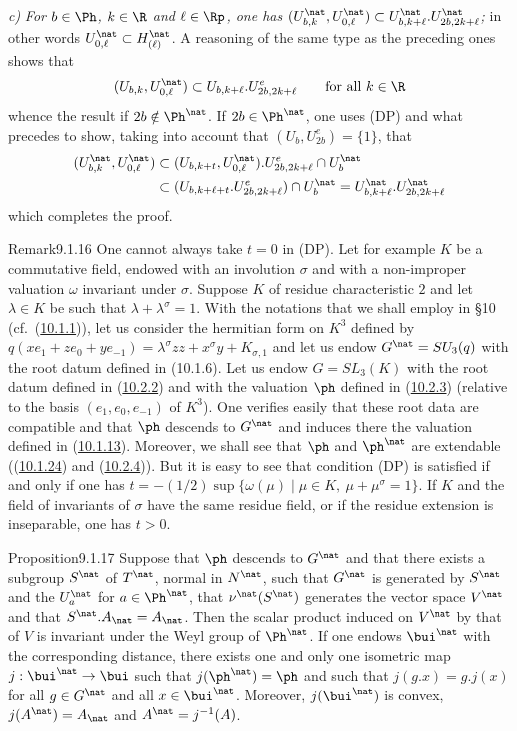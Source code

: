 \documentclass[12pt,a4paper,oneside,english]{smfart}
\makeatletter
\newcommand{\btanchor}[1]{\leavevmode\Hy@raisedlink{\hypertarget{bt:#1}{}}}
\newcommand{\btref}[1]{\hyperlink{bt:#1}{#1}}
\theoremstyle{definition}
\theoremstyle{bt}
\makeatother
\begin{document}
\medskip
\noindent
\textit{c)} \emph{For $b\in\Ph$, $k\in\R$ and $\ell\in\Rp$, one has
$(U^\nat_{b,k},U^\nat_{0,\ell})\subset U^\nat_{b,k+\ell}.U^\nat_{2b,2k+\ell}$;} in other
words $U^\nat_{0,\ell}\subset H^\nat_{(\ell)}$. A reasoning of the same type as the
preceding ones shows that
\[
(U_{b,k},U^\nat_{0,\ell})\subset U_{b,k+\ell}.U^e_{2b,2k+\ell}\qquad\text{for all } k\in\R
\]
whence the result if $2b\notin\Ph^\nat$. If $2b\in\Ph^\nat$, one uses (DP) and what
precedes to show, taking into account that $(U_b,U^e_{2b})=\{1\}$, that
\begin{align*}
(U^\nat_{b,k},U^\nat_{0,\ell})&\subset(U_{b,k+t},U^\nat_{0,\ell}).U^e_{2b,2k+\ell}\cap
U^\nat_b\\
&\subset(U_{b,k+\ell+t}.U^e_{2b,2k+\ell})\cap U^\nat_b
=U^\nat_{b,k+\ell}.U^\nat_{2b,2k+\ell}
\end{align*}
which completes the proof.

\begin{stmtup}{Remark}{9.1.16}\btanchor{9.1.16}
One cannot always take $t=0$ in (DP). Let for example $K$ be a commutative field,
endowed with an involution $\sigma$ and with a non-improper valuation $\omega$ invariant
under $\sigma$. Suppose $K$ of residue characteristic $2$ and let $\lambda\in K$ be such
that $\lambda+\lambda^\sigma=1$. With the notations that we shall employ in \S10
(cf.\ (\btref{10.1.1})), let us consider the hermitian form on $K^3$ defined by
$q(xe_1+ze_0+ye_{-1})=\lambda^\sigma zz+x^\sigma y+K_{\sigma,1}$ and let us endow
$G^\nat=SU_3(q)$ with the root datum defined in (10.1.6). Let us endow $G=SL_3(K)$ with
the root datum defined in (\btref{10.2.2}) and with the valuation $\ph$ defined in (\btref{10.2.3})
(relative to the basis $(e_1,e_0,e_{-1})$ of $K^3$). One verifies easily that these root
data are compatible and that $\ph$ descends to $G^\nat$ and induces there the valuation
defined in (\btref{10.1.13}). Moreover, we shall see that $\ph$ and $\ph^\nat$ are extendable
((\btref{10.1.24}) and (\btref{10.2.4})). But it is easy to see that condition (DP) is satisfied if and
only if one has $t=-(1/2)\sup\{\omega(\mu)\mid\mu\in K,\ \mu+\mu^\sigma=1\}$. If $K$ and
the field of invariants of $\sigma$ have the same residue field, or if the residue
extension is inseparable, one has $t>0$.
\end{stmtup}

\begin{stmt}{Proposition}{9.1.17}\btanchor{9.1.17}
Suppose that $\ph$ descends to $G^\nat$ and that there exists a subgroup $S^\nat$ of
$T^\nat$, normal in $N^\nat$, such that $G^\nat$ is generated by $S^\nat$ and the
$U^\nat_a$ for $a\in\Ph^\nat$, that $\nu^\nat(S^\nat)$ generates the vector space
$V^\nat$ and that $S^\nat.A_\nat=A_\nat$. Then the scalar product induced on $V^\nat$ by
that of $V$ is invariant under the Weyl group of $\Ph^\nat$. If one endows $\bui^\nat$
with the corresponding distance, there exists one and only one isometric map
$j:\bui^\nat\to\bui$ such that $j(\ph^\nat)=\ph$ and such that $j(g.x)=g.j(x)$ for all
$g\in G^\nat$ and all $x\in\bui^\nat$. Moreover, $j(\bui^\nat)$ is convex,
$j(A^\nat)=A_\nat$ and $A^\nat=j^{-1}(A)$.
\end{stmt}
\end{document}
